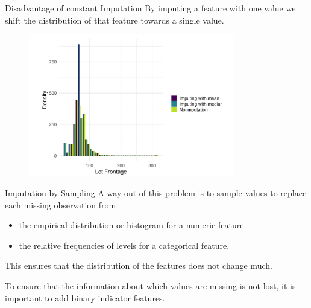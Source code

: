 \begin{vbframe}{Disadvantage of constant Imputation}
By imputing a feature with one value we shift the distribution of that feature towards a single value.


\begin{figure}
\includegraphics[width = 0.8\textwidth]{figure_man/constant-imputation.png}
\end{figure}

\end{vbframe}

\begin{vbframe}{Imputation by Sampling}
A way out of this problem is to sample values to replace each missing observation from
\vspace{+.4cm}

\begin{itemize}
\item the empirical distribution or histogram for a numeric feature.
\item the relative frequencies of levels for a categorical feature.
\end{itemize}
\vspace{+.4cm}

This ensures that the distribution of the features does not change much.
\vspace{+.4cm}

To ensure that the information about which values are missing is not lost, it is important to add binary indicator features.
\end{vbframe}

